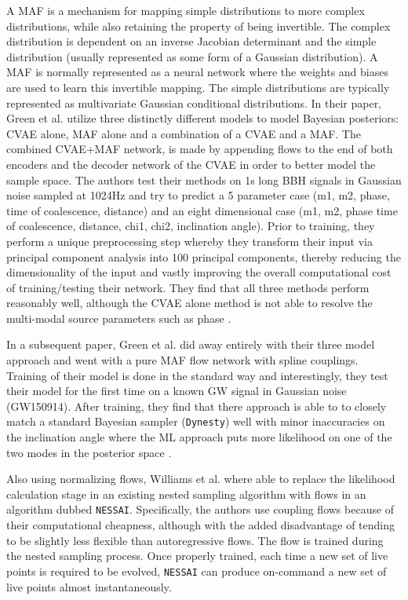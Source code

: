 A \ac{MAF} is a mechanism for mapping simple distributions to more complex distributions, while also retaining the property of being invertible. The complex distribution is dependent on an inverse Jacobian determinant and the simple distribution (usually represented as some form of a Gaussian distribution). A \ac{MAF} is normally represented as a neural network where the weights and biases are used to learn this invertible mapping. The simple distributions are typically represented as multivariate Gaussian conditional distributions. In their paper, Green et al. utilize three distinctly different models to model Bayesian posteriors: \ac{CVAE} alone, \ac{MAF} alone and a combination of a \ac{CVAE} and a \ac{MAF}. The combined \ac{CVAE}+\ac{MAF} network, is made by appending flows to the end of both encoders and the decoder network of the \ac{CVAE} in order to better model the sample space. The authors test their methods on 1s long \ac{BBH} signals in Gaussian noise sampled at 1024Hz and try to predict a 5 parameter case (m1, m2, phase, time of coalescence, distance) and an eight dimensional case (m1, m2, phase time of coalescence, distance, chi1, chi2, inclination angle). Prior to training, they perform a unique preprocessing step whereby they transform their input via principal component analysis into 100 principal components, thereby reducing the dimensionality of the input and vastly improving the overall computational cost of training/testing their network. They find that all three methods perform reasonably well, although the \ac{CVAE} alone method is not able to resolve the multi-modal source parameters such as phase \cite{PhysRevD.102.104057}. 

%
%

In a subsequent paper, Green et al. did away entirely with their three model approach and went with a pure \ac{MAF} flow network with spline couplings. Training of their model is done in the standard way and interestingly, they test their model for the first time on a known \ac{GW} signal in Gaussian noise (GW150914). After training, they find that there approach is able to to closely match a standard Bayesian sampler (\texttt{Dynesty}) well with minor inaccuracies on the inclination angle where the \ac{ML} approach puts more likelihood on one of the two modes in the posterior space \cite{2008.03312}.  


Also using normalizing flows, Williams et al. where able to replace the likelihood calculation stage in an existing nested sampling algorithm with flows in an algorithm dubbed \texttt{NESSAI}. Specifically, the authors use coupling flows because of their computational cheapness, although with the added disadvantage of tending to be slightly less flexible than autoregressive flows. The flow is trained during the nested sampling process. Once properly trained, each time a new set of live points is required to be evolved, \texttt{NESSAI} can produce on-command a new set of live points almost instantaneously.

